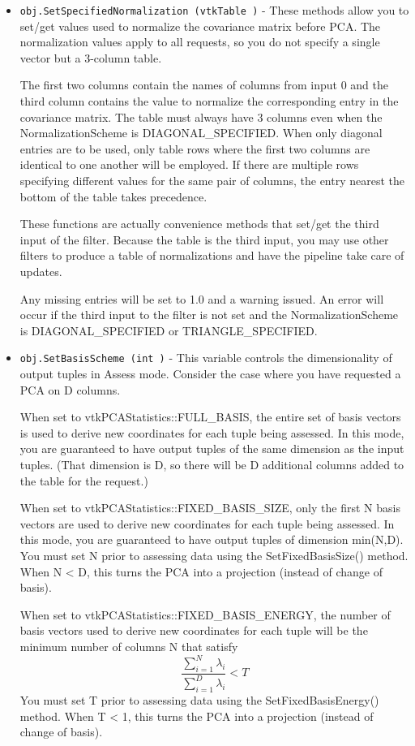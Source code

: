\begin{itemize}
\item  \verb|obj.SetSpecifiedNormalization (vtkTable )| -  These methods allow you to set/get values used to normalize the covariance matrix before PCA.
 The normalization values apply to all requests, so you do not specify a single
 vector but a 3-column table.

 The first two columns contain the names of columns from input 0 and the third column contains
 the value to normalize the corresponding entry in the covariance matrix.
 The table must always have 3 columns even when the NormalizationScheme is DIAGONAL\_SPECIFIED.
 When only diagonal entries are to be used, only table rows where the first two columns are
 identical to one another will be employed.
 If there are multiple rows specifying different values for the same pair of columns,
 the entry nearest the bottom of the table takes precedence.

 These functions are actually convenience methods that set/get the third input of the filter.
 Because the table is the third input, you may use other filters to produce a table of
 normalizations and have the pipeline take care of updates.

 Any missing entries will be set to 1.0 and a warning issued.
 An error will occur if the third input to the filter is not set and the
 NormalizationScheme is DIAGONAL\_SPECIFIED or TRIANGLE\_SPECIFIED.

\item  \verb|obj.SetBasisScheme (int )| -  This variable controls the dimensionality of output tuples in Assess mode.
 Consider the case where you have requested a PCA on D columns.

 When set to vtkPCAStatistics::FULL\_BASIS, the entire set of basis vectors
 is used to derive new coordinates for each tuple being assessed.
 In this mode, you are guaranteed to have output tuples of the same dimension
 as the input tuples. (That dimension is D, so there will be D additional
 columns added to the table for the request.)

 When set to vtkPCAStatistics::FIXED\_BASIS\_SIZE, only the first N basis vectors
 are used to derive new coordinates for each tuple being assessed.
 In this mode, you are guaranteed to have output tuples of dimension min(N,D).
 You must set N prior to assessing data using the SetFixedBasisSize() method.
 When N < D, this turns the PCA into a projection (instead of change of basis).

 When set to vtkPCAStatistics::FIXED\_BASIS\_ENERGY, the number of basis vectors
 used to derive new coordinates for each tuple will be the minimum number
 of columns N that satisfy
 \[
   \frac{\sum_{i=1}^{N} \lambda_i}{\sum_{i=1}^{D} \lambda_i} < T
 \]
 You must set T prior to assessing data using the SetFixedBasisEnergy() method.
 When T < 1, this turns the PCA into a projection (instead of change of basis).


\end{itemize}
